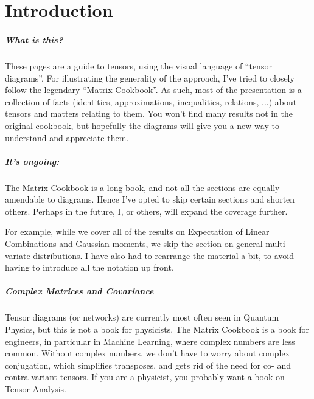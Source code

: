 
\chapter{Introduction}
\paragraph{What is this?}
These pages are a guide to tensors, using the visual language of ``tensor diagrams''.
For illustrating the generality of the approach, I've tried to closely follow the legendary ``Matrix Cookbook''.
As such, most of the presentation is a collection of facts (identities, approximations, inequalities, relations, ...) about tensors and matters relating to them.
You won't find many results not in the original cookbook, but hopefully the diagrams will give you a new way to understand and appreciate them.

\paragraph{It's ongoing:}
The Matrix Cookbook is a long book, and not all the sections are equally amendable to diagrams.
Hence I've opted to skip certain sections and shorten others.
Perhaps in the future, I, or others, will expand the coverage further.

For example, while we cover all of the results on Expectation of Linear Combinations and Gaussian moments, we skip the section on general multi-variate distributions.
I have also had to rearrange the material a bit, to avoid having to introduce all the notation up front.

\paragraph{Complex Matrices and Covariance}
Tensor diagrams (or networks) are currently most often seen in Quantum Physics,
but this is not a book for physicists.
The Matrix Cookbook is a book for engineers, in particular in Machine Learning, where complex numbers are less common.
Without complex numbers, we don't have to worry about complex conjugation, which simplifies transposes, and gets rid of the need for co- and contra-variant tensors.
If you are a physicist, you probably want a book on Tensor Analysis.

